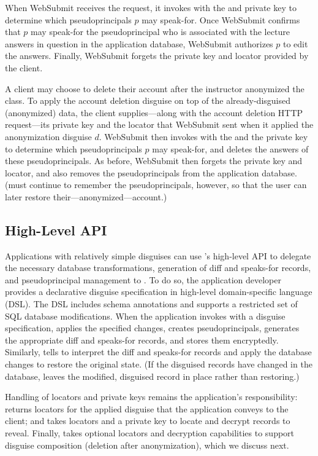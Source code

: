 When WebSubmit receives the request, it invokes  with the
 and private key to determine which pseudoprincipals $p$ may speak-for.
%
Once WebSubmit confirms that $p$ may speak-for the pseudoprincipal who is
associated with the lecture answers in question in the application database,
WebSubmit authorizes $p$ to edit the answers.
%
Finally, WebSubmit forgets the private key and locator provided by the client.
%

%
A client may choose to delete their account after the instructor anonymized the
class.
%
To apply the account deletion disguise on top of the already-disguised (anonymized)
data, the client supplies---along with the account deletion HTTP request---its
private key and the locator  that WebSubmit sent when it applied the
anonymization disguise $d$.
%
WebSubmit then invokes  with the  and the private
key to determine which pseudoprincipals $p$ may speak-for, and deletes the answers
of these pseudoprincipals.
%
As before, WebSubmit then forgets the private key and locator, and also removes
the pseudoprincipals from the application database.
%
(\sys must continue to remember the pseudoprincipals, however, so that the user
can later restore their---anonymized---account.)
%

\subsection{High-Level API}
\label{s:api-high}

%
Applications with relatively simple disguises can use \sys's high-level API to
delegate the necessary database transformations, generation of diff and speaks-for
records, and pseudoprincipal management to \sys.
%
To do so, the application developer provides a declarative disguise specification in
\sys high-level domain-specific language (DSL).
%
The DSL includes schema annotations and supports a restricted set of SQL database
modifications.
%
When the application invokes  with a disguise specification, \sys
applies the specified changes, creates pseudoprincipals, generates the appropriate
diff and speaks-for records, and stores them encryptedly.
%
Similarly,  tells \sys to interpret the diff and speaks-for
records and apply the database changes to restore the original state.
%
(If the disguised records have changed in the database, \sys leaves the modified,
disguised record in place rather than restoring.)
%

%
Handling of locators and private keys remains the application's responsibility:
 returns locators for the applied disguise that the
application conveys to the client; and  takes locators and a
private key to locate and decrypt records to reveal.
%
Finally,  takes optional locators and decryption capabilities
to support disguise composition (\eg deletion after anonymization), which
we discuss next.
%
